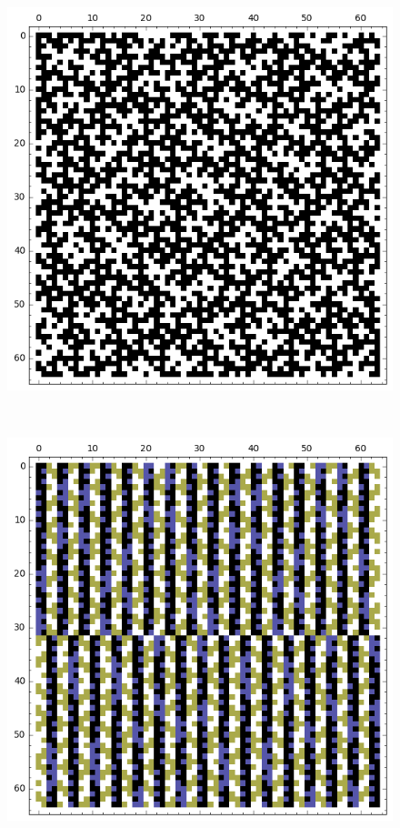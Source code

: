 \documentclass[12pt,a4paper]{article}
\begin{document}
\begin{figure}[!bhpt] %
\centering
\begin{minipage}{.48\textwidth}
  \centering
  \includegraphics[width=.9\linewidth]{../matrix_plot/re6_3_weight_class_matrix.png}
  \label{fig:6_3_weight_class_matrix}
\end{minipage}%
~~~~
\begin{minipage}{.48\textwidth}
  \centering
  \includegraphics[width=.9\linewidth]{../matrix_plot/re6_3_bent_cayley_graph_index_matrix.png}
  \label{fig:6_3_bent_cayley_graph_index_matrix}
\end{minipage}
\end{figure}
\end{document}
